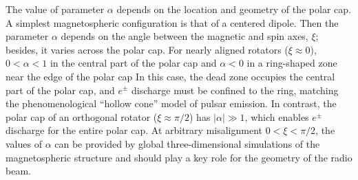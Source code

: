 The value of parameter $\alpha$ depends
on the location and geometry of the polar cap.
A simplest magnetospheric configuration is that of a centered dipole. Then
the parameter $\alpha$ depends on the angle between the magnetic and spin axes,
$\xi$; besides, it varies across the polar cap. For nearly
aligned rotators ($\xi\approx 0$),
$0<\alpha<1$ in the central part of the polar cap and $\alpha<0$
in a ring-shaped zone near the edge of the polar cap
\citep{timokhin_force-free_2006,parfrey_introducing_2012}
In this case, the dead zone occupies the
central part of the polar cap, and $e^\pm$ discharge must be confined to the ring,
matching the phenomenological ``hollow cone'' model of pulsar emission.
In contrast, the polar cap of an orthogonal rotator ($\xi\approx \pi/2$) has
$|\alpha|\gg 1$, which
enables $e^\pm$ discharge
for the entire polar cap.
At arbitrary misalignment $0<\xi<\pi/2$,
the values of $\alpha$
can be provided by global three-dimensional simulations
of the magnetospheric structure
\citep[e.g.][]{spitkovsky_time-dependent_2006}
and should play a key
role for the geometry of the radio beam.




